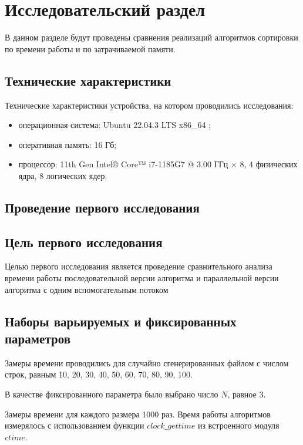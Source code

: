 \chapter{Исследовательский раздел}

В данном разделе будут проведены сравнения реализаций алгоритмов сортировки  по времени работы и по затрачиваемой памяти.

\section{Технические характеристики}

Технические характеристики устройства, на котором проводились исследования: 

\begin{itemize}[label=--]
	\item операционная система: Ubuntu 22.04.3 LTS x86\_64 \cite{info_os};
	\item оперативная память: 16 Гб;
	\item процессор: 11th Gen Intel® Core™ i7-1185G7 @ 3.00 ГГц × 8, 4 физических ядра, 8 логических ядер.
\end{itemize}

\section{Проведение первого исследования}

\section*{Цель первого исследования}

Целью первого исследования является проведение сравнительного анализа времени работы последовательной версии алгоритма и параллельной версии алгоритма с одним вспомогательным потоком

\section*{Наборы варьируемых и фиксированных параметров}

Замеры времени проводились для случайно сгенерированных файлом с числом строк, равным 10, 20, 30, 40, 50, 60, 70, 80, 90, 100.

В качестве фиксированного параметра было выбрано число $N$, равное 3.

Замеры времени для каждого размера 1000 раз. Время работы алгоритмов измерялось с использованием функции $clock\_gettime$ из встроенного модуля $ctime$.  

